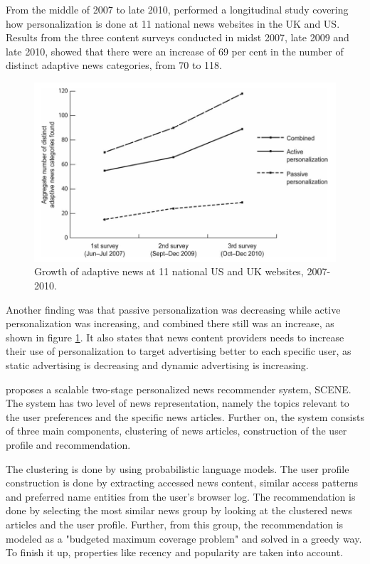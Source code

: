 From the middle of 2007 to late 2010, \cite{thurman2012future} performed a longitudinal study covering how personalization is done at 11 national news websites in the UK and US. Results from the three content surveys conducted in midst 2007, late 2009 and late 2010, showed that there were an increase of 69 per cent in the number of distinct adaptive news categories, from 70 to 118.

\begin{figure}[!htbp]
\centering
\includegraphics[width=130mm]{GFX/tech/longitudinalStudyIncreaseInPersonalization.png}
\caption{Growth of adaptive news at 11 national US and UK websites, 2007-2010.}
\label{longitudinal_study_increase_in_personalization}
\end{figure}

Another finding was that passive personalization was decreasing while active personalization was increasing, and combined there still was an increase, as shown in figure \ref{longitudinal_study_increase_in_personalization}. It also states that news content providers needs to increase their use of personalization to target advertising better to each specific user, as static advertising is decreasing and dynamic advertising is increasing.

\cite{li2011scene} proposes a scalable two-stage personalized news recommender system, SCENE. The system has two level of news representation, namely the topics relevant to the user preferences and the specific news articles. Further on, the system consists of three main components, clustering of news articles, construction of the user profile and recommendation.

The clustering is done by using probabilistic language models. The user profile construction is done by extracting accessed news content, similar access patterns and preferred name entities from the user's browser log. The recommendation is done by selecting the most similar news group by looking at the clustered news articles and the user profile. Further, from this group, the recommendation is modeled as a "budgeted maximum coverage problem"\cite{khullera1999budgeted} and solved in a greedy way. To finish it up, properties like recency and popularity are taken into account.

